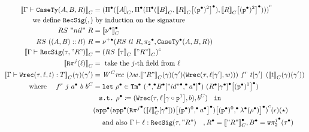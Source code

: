 \begin{align*}
  \denotesC{\goodType{\Gm}{\CaseSig{A}{B}{R}}{}} &= 
  \Gmodel{\GluedPi{\denotesC{A}}{\GluedPi {\GluedPi{\denotesC{B}}{\Gsub{\denotesC{R}}{\GSubstWeak{2}}}} {\Gsub{\denotesC{R}}{\GSubstWeak{2}}}}} \\
  \text{we define } \RecSig{}{} &\text{ by induction on the signature} \\
  RS~"nil"~R &= \denotesCC{\LSigEmp} \\
  RS~((A, B) :: tl)~R &= \GLSigAdd{RS~tl~R}{\Glued{\pi_2}}{\GCaseSig{A}{B}{R}} \\
  \denotesC{\goodType{\Gm}{\RecSig{\wsig}{"R"}}{}} &= \Gmodel{RS~\denotesC{\tau}~\denotesC{"R"}} \\
  \denotesC{\Recproj{j}{\lkg}} &= \text{ take the $j$-th field from } \lkg \\
  \denotesC{\goodTerm{\Gm}{\Wrec{\wsig}{\lkg}{t}}{T}}(\gm)(\gm') &= \CWrec~(\lambda w. \denotesC{"R"}(\gm)(\gm')(\Wrec{\wsig}{\sub{\lkg}{\gm'}}{w}))~f^r~\sub{t}{\gm'}~(\denotesC{t}(\gm)(\gm')) \\
  \text{ where } \quad f^r~j~\Glued{a}~b~b^C &= 
  \texttt{let}~\Glued{\rho}  \in \GTm{(\Glued{\cdot} \Glued{,} \Gsub{\Glued{B}}{\GSubstExt{\Glued{"id"}}{\Glued{a}}})}{(\Gsub{\Gsub{\Glued{R}}{\Glued{\gm}}}{\GSubstWeak{1}})} 
  \\
  & \ \texttt{ s.t.}~\Glued{\rho} \coloneq (\Wrec{\wsig}{\sub{\lkg}{\SubstComp{\gm}{\SubstWeak{1}}}}{b},b^C)~\texttt{ in } \\
  & \Gmodel{\Gsub{\Gapp{\Gsub{\Gapp{\GRecproj{j}{\sub{\denotesCC{\lkg}}{\Glued{\gm}}}}}{\GSubstExt{\GSubstId}{\Glued{a}}}}}{\GSubstExt{\GSubstId}{\Glam{\Glued{\rho}}}}}(\epsilon)(\star) \\
  & \quad 
   \text{ and also } \goodTerm{\Gm}{\lkg}{\RecSig{\wsig}{"R"}} \quad ,\Glued{R} = \denotesCC{"R"}, \Glued{B} = \Gwsigproj{j}{2}{\Glued{\wsig}}
\end{align*}

